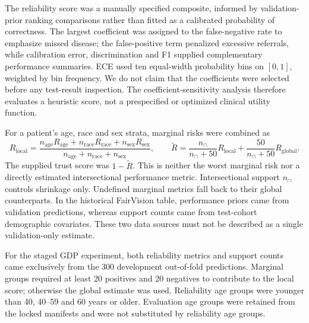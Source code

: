The reliability score was a manually specified composite, informed by
validation-prior ranking comparisons rather than fitted as a calibrated
probability of correctness. The largest coefficient was assigned to the
false-negative rate to emphasize missed disease; the false-positive term
penalized excessive referrals, while calibration error, discrimination and
F1 supplied complementary performance summaries. ECE used ten equal-width
probability bins on $[0,1]$, weighted by bin frequency. We do not claim that
the coefficients were selected before any test-result inspection. The
coefficient-sensitivity analysis therefore evaluates a heuristic score, not
a prespecified or optimized clinical utility function.

For a patient's age, race and sex strata, marginal risks were combined as
\begin{equation}
R_{\mathrm{local}} =
\frac{n_{\mathrm{age}}R_{\mathrm{age}}+
      n_{\mathrm{race}}R_{\mathrm{race}}+
      n_{\mathrm{sex}}R_{\mathrm{sex}}}
     {n_{\mathrm{age}}+n_{\mathrm{race}}+n_{\mathrm{sex}}},
\qquad
\widetilde R = \frac{n_{\cap}}{n_{\cap}+50}R_{\mathrm{local}}
 +\frac{50}{n_{\cap}+50}R_{\mathrm{global}}.
\end{equation}
The supplied trust score was $1-\widetilde R$. This is neither the worst
marginal risk nor a directly estimated intersectional performance metric.
Intersectional support $n_{\cap}$ controls shrinkage only. Undefined marginal
metrics fall back to their global counterparts. In the historical FairVision
table, performance priors came from validation predictions, whereas support
counts came from test-cohort demographic covariates. These two data sources
must not be described as a single validation-only estimate.

For the staged GDP experiment, both reliability metrics and support counts
came exclusively from the 300 development out-of-fold predictions. Marginal
groups required at least 20 positives and 20 negatives to contribute to the
local score; otherwise the global estimate was used. Reliability age groups
were younger than 40, 40--59 and 60 years or older. Evaluation age groups were
retained from the locked manifests and were not substituted by reliability
age groups.

